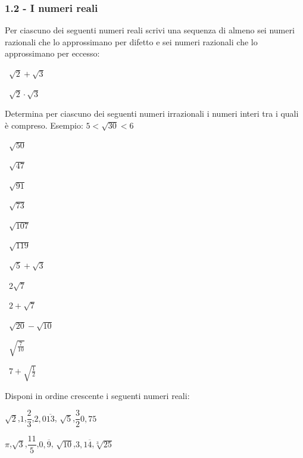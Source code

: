 \subsubsection*{1.2 - I numeri reali}

\begin{esercizio}
\label{ese:1.3}
 Per ciascuno dei seguenti numeri reali scrivi una sequenza di almeno sei 
numeri razionali che lo approssimano per difetto e sei numeri razionali che lo 
approssimano per eccesso:
\begin{multicols}{2}
\begin{enumeratea}
 \item~$\sqrt {2}+\sqrt {3}$
 \item~$\sqrt {2}\cdot\sqrt {3}$
\end{enumeratea}
\end{multicols}
\end{esercizio}

\begin{esercizio}
\label{ese:1.4}
 Determina per ciascuno dei seguenti numeri irrazionali i numeri interi tra i 
quali è compreso. Esempio: $5<\sqrt{30}<6$
\begin{multicols}{4}
\begin{enumeratea}
 \item~$\sqrt{50}$
 \item~$\sqrt{47}$
 \item~$\sqrt{91}$
 \item~$\sqrt{73}$
 \item~$\sqrt{107}$
 \item~$\sqrt{119}$
 \item~$\sqrt 5+\sqrt 3$
 \item~$2\sqrt 7$
 \item~$2+\sqrt 7$
 \item~$\sqrt{20}-\sqrt{10}$
 \item~$\sqrt{\frac 7{10}}$
 \item~$7+\sqrt{\frac 1 2}$
\end{enumeratea}
\end{multicols}
\end{esercizio}

\begin{esercizio}
\label{ese:1.5}
 Disponi in ordine crescente i seguenti numeri reali:
\begin{multicols}{2}
 \begin{enumeratea}
 \item $\sqrt 2$,\quad $1$,\quad $\dfrac 2 3$,\quad $2,0\overline{13}$,\quad 
$\sqrt 5$,\quad $\dfrac 3 2$\quad $0,75$
 \item $\pi$,\quad $\sqrt 3$,\quad $\dfrac{11} 5$,\quad $0,\overline 9$,\quad 
$\sqrt{10}$,\quad $3,1\overline 4$,\quad $\sqrt[3]{25}$
 \end{enumeratea}
\end{multicols}
\end{esercizio}

